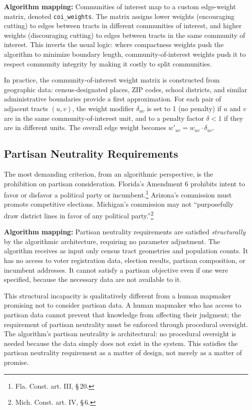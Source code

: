 \textbf{Algorithm mapping:} Communities of interest map to a custom edge-weight matrix, denoted \texttt{coi\_weights}. The matrix assigns lower weights (encouraging cutting) to edges between tracts in different communities of interest, and higher weights (discouraging cutting) to edges between tracts in the same community of interest. This inverts the usual logic: where compactness weights push the algorithm to minimize boundary length, community-of-interest weights push it to respect community integrity by making it costly to split communities.

In practice, the community-of-interest weight matrix is constructed from geographic data: census-designated places, ZIP codes, school districts, and similar administrative boundaries provide a first approximation. For each pair of adjacent tracts $(u,v)$, the weight modifier $\delta_{uv}$ is set to 1 (no penalty) if $u$ and $v$ are in the same community-of-interest unit, and to a penalty factor $\delta < 1$ if they are in different units. The overall edge weight becomes $w'_{uv} = w_{uv} \cdot \delta_{uv}$.

\subsection{Partisan Neutrality Requirements}

The most demanding criterion, from an algorithmic perspective, is the prohibition on partisan consideration. Florida's Amendment 6 prohibits intent to favor or disfavor a political party or incumbent.\footnote{Fla. Const. art. III, \S\,20.} Arizona's commission must promote competitive elections. Michigan's commission may not ``purposefully draw district lines in favor of any political party.''\footnote{Mich. Const. art. IV, \S\,6.}

\textbf{Algorithm mapping:} Partisan neutrality requirements are satisfied \textit{structurally} by the algorithmic architecture, requiring no parameter adjustment. The algorithm receives as input only census tract geometries and population counts. It has no access to voter registration data, election results, partisan composition, or incumbent addresses. It cannot satisfy a partisan objective even if one were specified, because the necessary data are not available to it.

This structural incapacity is qualitatively different from a human mapmaker promising not to consider partisan data. A human mapmaker who has access to partisan data cannot prevent that knowledge from affecting their judgment; the requirement of partisan neutrality must be enforced through procedural oversight. The algorithm's partisan neutrality is architectural: no procedural oversight is needed because the data simply does not exist in the system. This satisfies the partisan neutrality requirement as a matter of design, not merely as a matter of promise.


